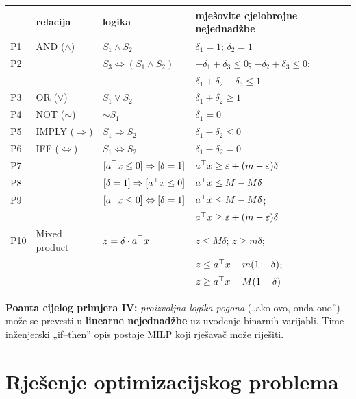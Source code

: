 \begin{center}
\small
\begin{tabular}{llll}
\toprule
 & \textbf{relacija} & \textbf{logika} & \textbf{mješovite cjelobrojne nejednadžbe} \\
\midrule
P1 & AND ($\wedge$) & $S_1 \wedge S_2$
   & $\delta_1 = 1$;\; $\delta_2 = 1$ \\
P2 & & $S_3 \Leftrightarrow (S_1 \wedge S_2)$
   & $-\delta_1 + \delta_3 \le 0$;\; $-\delta_2 + \delta_3 \le 0$; \\
   & & & $\delta_1 + \delta_2 - \delta_3 \le 1$ \\
P3 & OR ($\vee$) & $S_1 \vee S_2$ & $\delta_1 + \delta_2 \ge 1$ \\
P4 & NOT ($\sim$) & $\sim\! S_1$ & $\delta_1 = 0$ \\
P5 & IMPLY ($\Rightarrow$) & $S_1 \Rightarrow S_2$
   & $\delta_1 - \delta_2 \le 0$ \\
P6 & IFF ($\Leftrightarrow$) & $S_1 \Leftrightarrow S_2$
   & $\delta_1 - \delta_2 = 0$ \\
P7 & & $[a^{\top} x \le 0] \Rightarrow [\delta = 1]$
   & $a^{\top} x \ge \varepsilon + (m - \varepsilon)\delta$ \\
P8 & & $[\delta = 1] \Rightarrow [a^{\top} x \le 0]$
   & $a^{\top} x \le M - M\delta$ \\
P9 & & $[a^{\top} x \le 0] \Leftrightarrow [\delta = 1]$
   & $a^{\top} x \le M - M\delta$; \\
   & & & $a^{\top} x \ge \varepsilon + (m - \varepsilon)\delta$ \\
P10 & Mixed product & $z = \delta \cdot a^{\top} x$
   & $z \le M\delta$;\; $z \ge m\delta$; \\
   & & & $z \le a^{\top} x - m(1-\delta)$; \\
   & & & $z \ge a^{\top} x - M(1-\delta)$ \\
\bottomrule
\end{tabular}
\end{center}

\textbf{Poanta cijelog primjera IV:} \emph{proizvoljna logika pogona} („ako
ovo, onda ono”) može se prevesti u \textbf{linearne nejednadžbe} uz uvođenje
binarnih varijabli. Time inženjerski „if--then” opis postaje MILP koji rješavač
može riješiti.

\section{Rješenje optimizacijskog problema}

